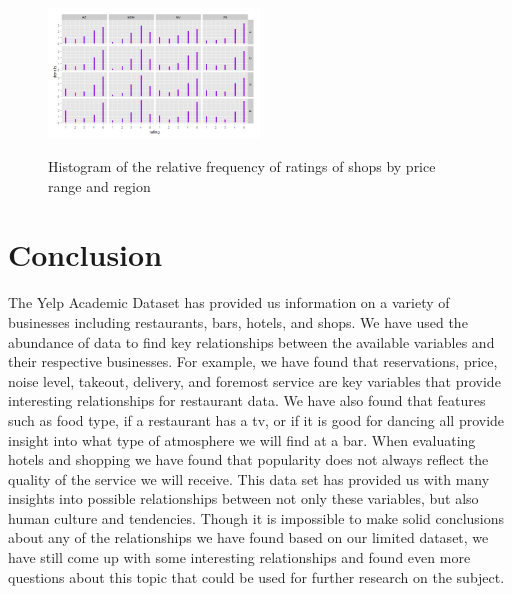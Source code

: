 \documentclass[11pt]{article}
\begin{document}
\begin{figure}[h!]
           \caption{Histogram of the relative frequency of ratings of shops by price range and region}
	\centering
	\includegraphics[width=0.5\textwidth]{Figures/shopping3.jpeg}
           \label{shopping3}
\end{figure}


\section{Conclusion}

The Yelp Academic Dataset has provided us information on a variety of businesses including restaurants, bars, hotels, and shops.  We have used the abundance of data to find key relationships between the available variables and their respective businesses.  For example, we have found that reservations, price, noise level, takeout, delivery, and foremost service are key variables that provide interesting relationships for restaurant data.  We have also found that features such as food type, if a restaurant has a tv, or if it is good for dancing all provide insight into what type of atmosphere we will find at a bar.  When evaluating  hotels and shopping we have found that popularity does not always reflect the quality of the service we will receive.  This data set has provided us with many insights into possible relationships between not only these variables, but also human culture and tendencies.  Though it is impossible to make solid conclusions about any of the relationships we have found based on our limited dataset, we have still come up with some interesting relationships and found even more questions about this topic that could be used for further research on the subject.
\end{document}
